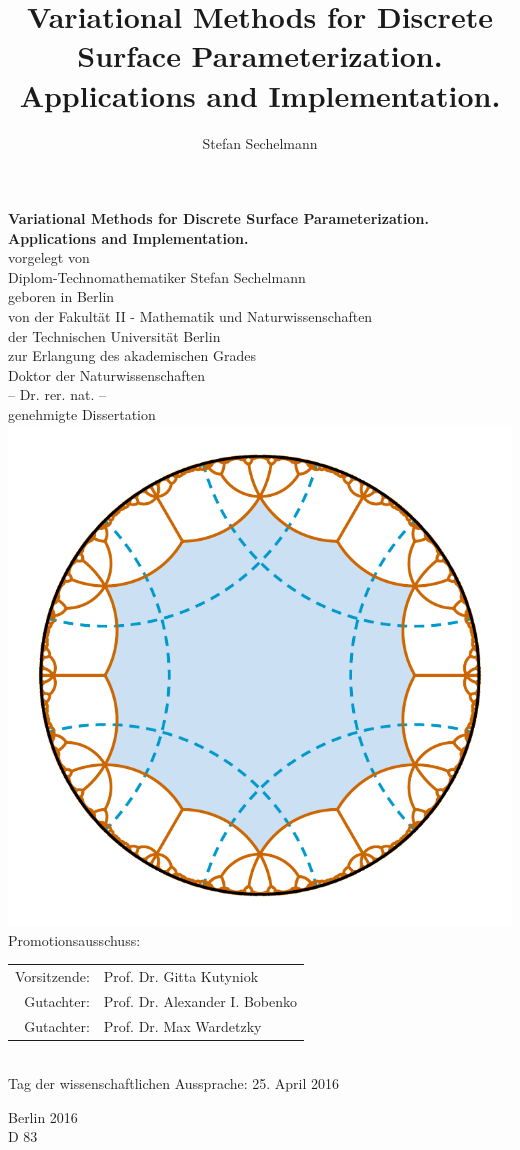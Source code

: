 \documentclass[a4paper]{book}
\title{Variational Methods for Discrete Surface Parameterization. Applications and Implementation.}
\author{Stefan Sechelmann}
\def\subfilebibliography {
	\backmatter
	\setcounter{secnumdepth}{-1}
	
	
}
\def\subfilebibliographytwo {
	\backmatter
	\setcounter{secnumdepth}{-1}
	
	
}
\begin{document}
\def\subfilebibliography{}
\def\subfilebibliographytwo{}

\frontmatter

\begin{titlepage}
\begin{center}
\large
{\Large\bf Variational Methods for Discrete Surface Parameterization. Applications and Implementation.}\\
\vspace{0.8cm}
vorgelegt von\\
Diplom-Technomathematiker Stefan Sechelmann\\
geboren in Berlin\\
\vspace{0.8cm}
von der Fakult{\"a}t II - Mathematik und Naturwissenschaften\\
der Technischen Universit{\"a}t Berlin\\
zur Erlangung des akademischen Grades\\
\vspace{0.8cm}
Doktor der Naturwissenschaften\\
-- Dr. rer. nat. --\\
\vspace{0.8cm}
genehmigte Dissertation\\
\vspace{0.6cm}
\includegraphics[width=0.4\linewidth]{introduction/title_lawson_cyclic.pdf}\\
\vspace{0.6cm}
Promotionsausschuss:\\
\vspace{0.3cm}
\begin{tabular}{rl}
Vorsitzende:& Prof. Dr. Gitta Kutyniok \\
Gutachter:& Prof. Dr. Alexander I. Bobenko \\
Gutachter:& Prof. Dr. Max Wardetzky
\end{tabular}\\
\vspace{0.3cm}
Tag der wissenschaftlichen Aussprache: 25. April 2016\\
\vspace{0.8cm}

Berlin 2016\\
\vspace{0.3cm}
D 83
\end{center}
\end{titlepage}
\end{document}
